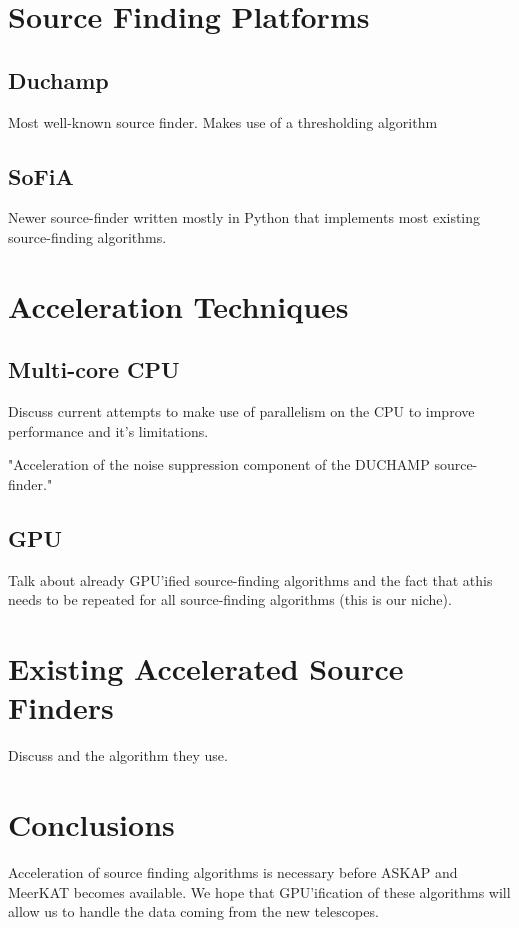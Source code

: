 \documentclass[prodmode,acmtecs]{acmsmall}
\begin{document}
\section{Source Finding Platforms}
    \subsection{Duchamp}
Most well-known source finder. Makes use of a thresholding algorithm
        \cite{whiting2012duchamp}
    \subsection{SoFiA}
Newer source-finder written mostly in Python that implements most
existing source-finding algorithms.
        \cite{serra2015sofia}

\section{Acceleration Techniques}
    \subsection{Multi-core CPU}
Discuss current attempts to make use of parallelism on the CPU to improve performance
and it's limitations.
        \cite{westerlund2014framework}
        \cite{scott}

    "Acceleration of the noise suppression component of the DUCHAMP source-finder."
    \subsection{GPU}
Talk about already GPU'ified source-finding algorithms and the fact that athis needs
to be repeated for all source-finding algorithms (this is our niche).
    \cite{laidler2013detection}
    \cite{hassan2011unleashing}

\section{Existing Accelerated Source Finders}
Discuss \cite{westerlund2015performance} and the algorithm they use.

\section{Conclusions}
Acceleration of source finding algorithms is necessary before ASKAP and MeerKAT becomes
available. We hope that GPU'ification of these algorithms will allow us to handle the
data coming from the new telescopes.



\end{document}

